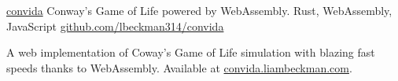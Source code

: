 \showoff
{\textcolor{my-blue}{\href{https://convida.liambeckman.com/}{convida}}}
{Conway's Game of Life powered by WebAssembly.}
{Rust, WebAssembly, JavaScript}
{\textcolor{my-blue}{\href{https://github.com/lbeckman314/convida}{github.com/lbeckman314/convida}}}

A web implementation of Coway's Game of Life simulation with blazing fast speeds thanks to WebAssembly. Available at \textcolor{my-blue}{\href{https://convida.liambeckman.com}{convida.liambeckman.com}}.

\myBreak
